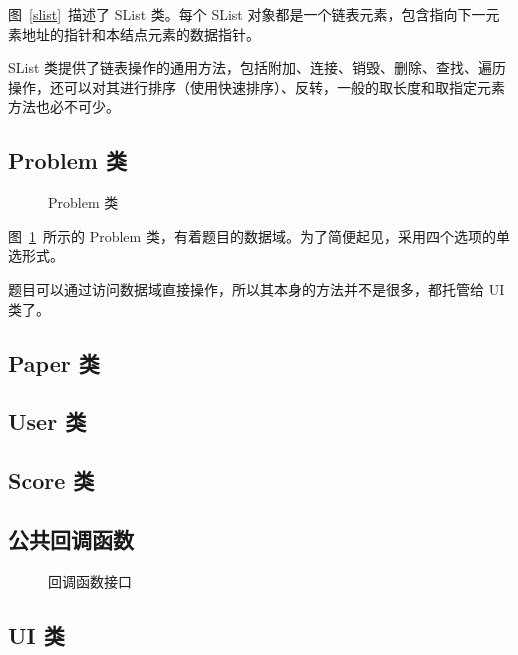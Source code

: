 图~\ref{slist}~描述了 SList 类。每个 SList 对象都是一个链表元素，包含指向下一元素地址的指针和本结点元素的数据指针。

SList 类提供了链表操作的通用方法，包括附加、连接、销毁、删除、查找、遍历操作，还可以对其进行排序（使用快速排序）、反转，一般的取长度和取指定元素方法也必不可少。

\subsection{Problem 类}

\begin{figure}[htp]
  \pictext\small
{}
  \caption{\label{problem}Problem 类}
\end{figure}

图~\ref{problem}~所示的 Problem 类，有着题目的数据域。为了简便起见，采用四个选项的单选形式。

题目可以通过访问数据域直接操作，所以其本身的方法并不是很多，都托管给 UI 类了。

\subsection{Paper 类}



\subsection{User 类}



\subsection{Score 类}



\subsection{公共回调函数}
\label{sec_callback}

\begin{figure}[htp]
  \pictext\small
  \caption{\label{callback}回调函数接口}
\end{figure}



\subsection{UI 类}


